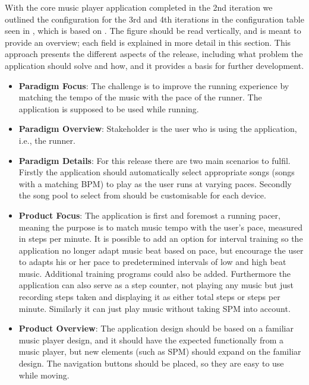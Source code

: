 With the core music player application completed in the 2nd iteration we outlined the configuration for the 3rd and 4th iterations in the configuration table seen in , which is based on \citet[ch. 3]{essence:config}. The figure should be read vertically, and is meant to provide an overview; each field is explained in more detail in this section. This approach presents the different aspects of the release, including what problem the application should solve and how, and it provides a basis for further development.




\begin{itemize}
\item \textbf{Paradigm Focus}: The challenge is to improve the running experience by matching the tempo of the music with the pace of the runner. The application is supposed to be used while running.

\item \textbf{Paradigm Overview}: Stakeholder is the user who is using the application, i.e., the runner.

\item \textbf{Paradigm Details}: For this release there are two main scenarios to fulfil. Firstly the application should automatically select appropriate songs (songs with a matching BPM) to play as the user runs at varying paces. Secondly the song pool to select from should be customisable for each device.

\item \textbf{Product Focus}: The application is first and foremost a running pacer, meaning the purpose is to match music tempo with the user's pace, measured in steps per minute. It is possible to add an option for interval training so the application no longer adapt music beat based on pace, but encourage the user to adapts his or her pace to predetermined intervals of low and high beat music. Additional training programs could also be added. Furthermore the application can also serve as a step counter, not playing any music but just recording steps taken and displaying it as either total steps or steps per minute. Similarly it can just play music without taking SPM into account.

\item \textbf{Product Overview}: The application design should be based on a familiar music player design, and it should have the expected functionally from a music player, but new elements (such as SPM) should expand on the familiar design. The navigation buttons should be placed, so they are easy to use while moving.


\end{itemize}

